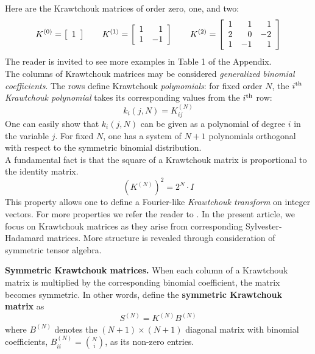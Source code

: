 \documentclass[12pt]{article}
\def\KM{K}
\def\FFF#1#2{K^{(#1)}_{#2}}
\numberwithin{equation}{section}
\begin{document}
Here are the Krawtchouk  matrices of order zero, one, and two:
%
\begin{equation*}
\KM^{(0)}=\left[\begin{array}{rr}{ 1 }\end{array}\right] \qquad
\KM^{(1)}=\left[        
  \begin{array}{rr}
             1 &  1 \cr
             1 & -1 \cr 
             \end{array}\right]
 \qquad
\KM^{(2)}=\left[        
  \begin{array}{rrr}
             1 &  1 &  1 \cr
             2 &  0 & -2 \cr 
             1 & -1 &  1 \cr                 
             \end{array}\right]
 \end{equation*}
%
The reader is invited to see more examples in Table 1 of the Appendix. 
\\

The columns of Krawtchouk matrices may be considered 
\emph{generalized binomial coefficients}.
The rows define Krawtchouk \emph{polynomials}: for fixed order 
$N$, the $i^{\rm th}$ \emph{Krawtchouk polynomial} 
takes its corresponding values from the $i^{\rm th}$ row: 
\begin{equation} \label{eq:poly}
      k_i(j,N) = \KM^{(N)}_{ij} 
\end{equation}
 One can easily show that $k_i(j,N)$ can be given as a
polynomial of degree $i$ in the variable $j$. 
For fixed $N$, one has a system of $N+1$ polynomials orthogonal 
with respect to the symmetric binomial distribution.
\\

A  fundamental fact is that  
the square of a Krawtchouk  matrix is proportional to the identity matrix.
$$
(\FFF N{})^2 = 2^N \cdot I
$$
This property allows one to define 
a Fourier-like {\em Krawtchouk transform} on integer vectors. 
For more properties we refer the reader to \cite{FK}. In the present article, we focus
on Krawtchouk matrices as they arise from corresponding Sylvester-Hadamard matrices.
More structure is revealed through consideration of symmetric tensor algebra.

\bigskip
\noindent
{\bf Symmetric Krawtchouk matrices. }
When each column of a Krawtchouk matrix is multiplied by the corresponding binomial
coefficient, the matrix becomes symmetric.
In other words, define the  {\bf symmetric Krawtchouk  matrix} as
$$
S^{(N)}=\FFF N{}B^{(N)}
$$
where $B^{(N)}$ denotes the $(N+1)\times (N+1)$ diagonal matrix 
with binomial coefficients, 
$
          B^{(N)}_{ii}={N\choose i}
$, as its non-zero entries.
\end{document}

